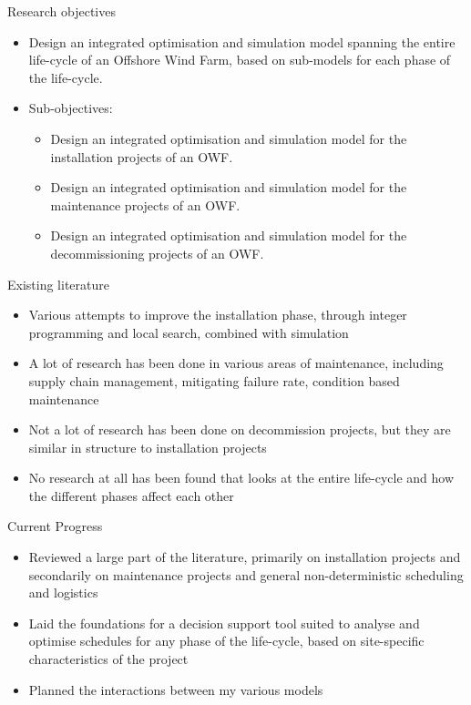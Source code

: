 \documentclass{beamer}
\begin{document}
\begin{frame}{Research objectives}
  \begin{itemize}
  	\item Design an integrated optimisation and simulation model spanning the entire life-cycle of an Offshore Wind Farm, based on sub-models for each phase of the life-cycle.
  	\item Sub-objectives:
  	\begin{itemize}
  		\item Design an integrated optimisation and simulation model for the installation projects of an OWF. 
  		\item Design an integrated optimisation and simulation model for the maintenance projects of an OWF. 
  		\item Design an integrated optimisation and simulation model for the decommissioning projects of an OWF. 
  	\end{itemize}
  \end{itemize}
\end{frame}


\begin{frame}{Existing literature}
   \begin{itemize}
  	\item Various attempts to improve the installation phase, through integer programming and local search, combined with simulation
  	\item A lot of research has been done in various areas of maintenance, including supply chain management, mitigating failure rate, condition based maintenance
  	\item Not a lot of research has been done on decommission projects, but they are similar in structure to installation projects
  	\item No research at all has been found that looks at the entire life-cycle and how the different phases affect each other
  \end{itemize}
\end{frame}


\begin{frame}{Current Progress}
   \begin{itemize}
  	\item Reviewed a large part of the literature, primarily on installation projects and secondarily on maintenance projects and general non-deterministic scheduling and logistics
  	\item Laid the foundations for a decision support tool suited to analyse and optimise schedules for any phase of the life-cycle, based on site-specific characteristics of the project
  	\item Planned the interactions between my various models	
  \end{itemize}
\end{frame}
\end{document}
